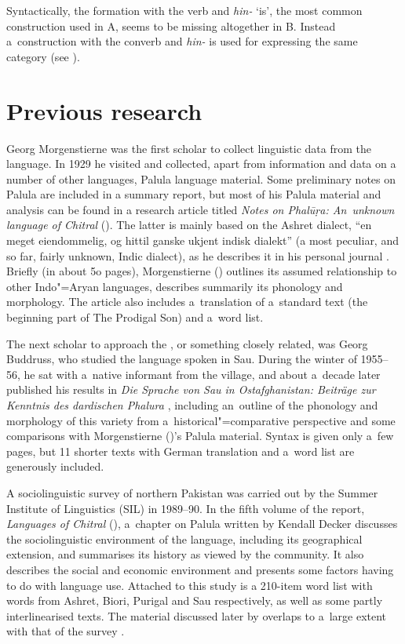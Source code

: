 Syntactically, the  formation with the   verb and \textit{hin-} `is', the most common construction used in A, seems to be missing altogether in B. Instead a~construction with the  converb and \textit{hin-} is used for expressing the same category (see ).


\section{Previous research}
\label{sec:1-5}

Georg Morgenstierne was the first scholar to collect linguistic data from the language. In 1929 he visited \iliChitral and
collected, apart from information and data on a number of other languages, Palula language material. Some preliminary notes on Palula are included in a summary report, but most of his Palula material and analysis can be found in a research article titled \textit{Notes on Phal\=uṛa: An~unknown \iliDardic language of Chitral}
(\citeyear{morgenstierne1941}). The latter is mainly based on the Ashret dialect, ``en meget eiendommelig, og hittil ganske ukjent indisk dialekt'' (a most peculiar, and so far, fairly unknown, Indic dialect), as he describes it in his personal journal \citep[38]{morgenstiernelorentzen1992}. Briefly (in about 5o pages),
Morgenstierne (\citeyear{morgenstierne1941}) outlines its assumed relationship to other Indo"=Aryan languages, describes summarily its
phonology and morphology. The article also includes a~translation of a~standard text (the beginning part of The Prodigal Son) and
a~word list.


The next scholar to approach the , or something closely related, was Georg
Buddruss, who studied the language spoken in Sau. During the winter of 1955--56, he sat with a~native
informant from the village, and about a~decade later published his results in \textit{Die Sprache
  von Sau in Ostafghanistan: Beiträge zur Kenntnis des dardischen Phalura} \citep{buddruss1967},
including an~outline of the phonology and morphology of this variety from a~historical"=comparative
perspective and some comparisons with Morgenstierne (\citeyear{morgenstierne1941})'s Palula material. Syntax is given only a~few
pages, but 11 shorter texts with German translation and a~word list are generously included.


A sociolinguistic survey of northern Pakistan was carried out by the Summer Institute of Linguistics
(SIL) in 1989--90. In the fifth volume of the report, \textit{Languages of Chitral}
(\citealt{decker1992a}), a~chapter on Palula written by Kendall Decker discusses the
sociolinguistic environment of the language, including its geographical extension, and summarises
its history as viewed by the community. It also describes the social and economic environment and
presents some factors having to do with language use. Attached to this study is a 210-item word list
with words from Ashret, Biori, Purigal and Sau respectively, as well as some partly interlinearised
texts. The material discussed later by \citet{decker1992b,decker1996} overlaps to a~large
extent with that of the survey \citep{decker1992a}.


